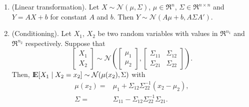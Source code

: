 \documentclass[a4paper,10pt]{article}
\begin{document}
\begin{enumerate}
 
 \item (Linear transformation). Let $X\sim \mathcal{N}(\mu,\Sigma)$, $\mu\in\Re^n$, $\Sigma\in\Re^{n\times n}$ 
       and $Y=AX+b$ for constant $A$ and $b$. Then $Y\sim \mathcal{N}(A\mu+b, A\Sigma A')$.
 \item (Conditioning). Let $X_1$, $X_2$ be two random variables with values in $\Re^{n_1}$ and $\Re^{n_2}$
       respectively. Suppose that
\begin{equation*}
        \begin{bmatrix}
         X_1\\X_2
        \end{bmatrix}
{}\sim{}
	\mathcal{N}\left(
	\begin{bmatrix}
         \mu_1\\\mu_2
        \end{bmatrix},
        \begin{bmatrix}
         \Sigma_{11} & \Sigma_{12}\\
         \Sigma_{21} & \Sigma_{22}
        \end{bmatrix}
        \right).
\end{equation*}
Then, \(\E[X_1\mid X_2=x_2] \sim \mathcal{N}(\mu(x_2), \Sigma)\) with 
\begin{align*}
	\mu(x_2) 
{}={}& 
	\mu_1 
{}+{}
	\Sigma_{12}\Sigma_{22}^{-1}(x_2{}-{}\mu_2),
\\
	\Sigma 
{}={}&
	\Sigma_{11}
{}-{}
	\Sigma_{12}\Sigma_{22}^{-1}\Sigma_{21}.
\end{align*}
\end{enumerate}
\end{document}

